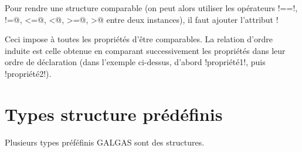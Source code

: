 Pour rendre une structure comparable (on peut alors utiliser les opérateurs \ggsq!==!, \ggsq@!=@, \ggsq@<=@, \ggsq@<@, \ggsq@>=@, \ggsq@>@ entre deux instances), il faut ajouter l'attribut \ggsq!%


Ceci impose à toutes les propriétés d'être comparables. La relation d'ordre induite est celle obtenue en comparant successivement les propriétés dans leur ordre de déclaration (dans l'exemple ci-dessus, d'abord \ggsq!propriété1!, puis \ggsq!propriété2!).






\section{Types structure prédéfinis}

Plusieurs types préféfinis GALGAS sont des structures.




















